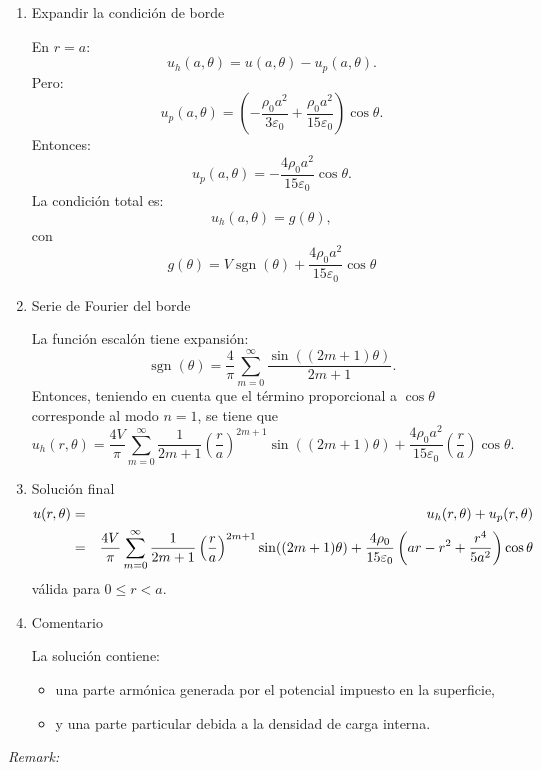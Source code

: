 \documentclass[11pt,spanish]{article}
\begin{document}
\begin{enumerate}
\item Expandir la condición de borde

En $r=a$:
$$
u_h(a,\theta)
=
u(a,\theta)-u_p(a,\theta).
$$
Pero:
$$
u_p(a,\theta)
=
\left(
-\frac{\rho_0 a^2}{3\varepsilon_0}
+
\frac{\rho_0 a^2}{15\varepsilon_0}
\right)\cos\theta.
$$
Entonces:
$$
u_p(a,\theta)
=
-\frac{4\rho_0 a^2}{15\varepsilon_0}\cos\theta.
$$
La condición total es:
$$
u_h(a,\theta)=
g(\theta),
$$
con
$$
g(\theta)
=
V\operatorname{sgn}(\theta)
+
\dfrac{4\rho_0 a^2}{15\varepsilon_0}\cos\theta
$$

\item Serie de Fourier del borde

La función escalón tiene expansión:
$$
\operatorname{sgn}(\theta)
=
\frac4\pi
\sum_{m=0}^\infty
\frac{\sin((2m+1)\theta)}{2m+1}.
$$
Entonces, teniendo en cuenta que el término proporcional a $\cos\theta$ corresponde al modo $n=1$, se tiene que
$$
u_h(r,\theta)
=
\frac{4V}{\pi}
\sum_{m=0}^\infty
\frac{1}{2m+1}
\left(\frac{r}{a}\right)^{2m+1}
\sin((2m+1)\theta)
+
\frac{4\rho_0 a^2}{15\varepsilon_0}
\left(\frac{r}{a}\right)\cos\theta.
$$

\item Solución final
\begin{eqnarray}
u(r,\theta)
&=&
u_h(r,\theta)
+
u_p(r,\theta)
\notag
\\
&=&
\frac{4V}{\pi}
\sum_{m=0}^\infty
\frac{1}{2m+1}
\left(\frac{r}{a}\right)^{2m+1}
\sin((2m+1)\theta)
+
\frac{4\rho_0}{15\varepsilon_0}
\left(
a r-r^2+\frac{r^4}{5a^2}
\right)\cos\theta
\notag
\end{eqnarray}
válida para $0\le r<a$.

\item Comentario

La solución contiene:
\begin{itemize}
\item una parte armónica generada por el potencial impuesto en la superficie,
\item y una parte particular debida a la densidad de carga interna.
\end{itemize}

\end{enumerate}

{\em Remark:}
\end{document}
